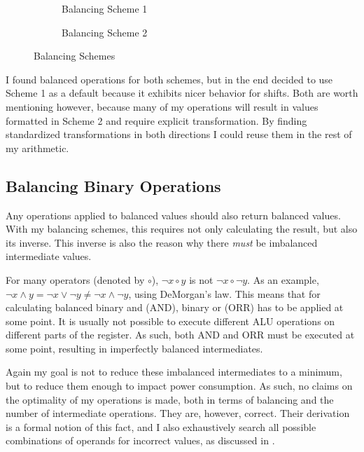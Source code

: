 \begin{figure}[h]
  \centering
  \begin{subfigure}{.49\linewidth}
    \centering
    \caption{Balancing Scheme 1}
    \label{fig:scheme1}
  \end{subfigure}
  \begin{subfigure}{0.49\linewidth}
    \centering
    \caption{Balancing Scheme 2}
  \end{subfigure}
  \caption{Balancing Schemes}
  \label{fig:schemes}
\end{figure}

I found balanced operations for both schemes, but in the end decided to use Scheme 1 as a default because it exhibits nicer behavior for shifts.
Both are worth mentioning however, because many of my operations will result in values formatted in Scheme 2 and require explicit transformation.
By finding standardized transformations in both directions I could reuse them in the rest of my arithmetic.

\subsection{Balancing Binary Operations}
\label{operations}
Any operations applied to balanced values should also return balanced values.
With my balancing schemes, this requires not only calculating the result, but also its inverse.
This inverse is also the reason why there \emph{must} be imbalanced intermediate values.

For many operators (denoted by $\circ$), $\neg{x \circ y}$ is not $\neg{x} \circ \neg{y}$.
As an example, $\neg{x \land y} = \neg{x} \lor \neg{y} \neq \neg{x} \land \neg{y}$, using DeMorgan's law.
This means that for calculating balanced binary and (AND), binary or (ORR) has to be applied at some point.
It is usually not possible to execute different ALU operations on different parts of the register.
As such, both AND and ORR must be executed at some point, resulting in imperfectly balanced intermediates.

Again my goal is not to reduce these imbalanced intermediates to a minimum, but to reduce them enough to impact power consumption.
As such, no claims on the optimality of my operations is made, both in terms of balancing and the number of intermediate operations.
They are, however, correct.
Their derivation is a formal notion of this fact, and I also exhaustively search all possible combinations of operands for incorrect values, as discussed in .

